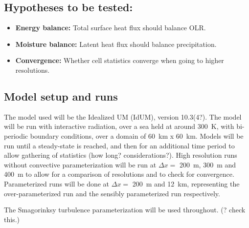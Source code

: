 \documentclass{article}
\begin{document}
\subsection*{Hypotheses to be tested:}

\begin{itemize}
    \item \textbf{Energy balance:} Total surface heat flux should balance OLR.
    \item \textbf{Moisture balance:} Latent heat flux should balance precipitation.
    \item \textbf{Convergence:} Whether cell statistics converge when going to higher resolutions.
\end{itemize}

\subsection*{Model setup and runs}

The model used will be the Idealized UM (IdUM), version 10.3(4?). The model will be run with
interactive radiation, over a sea held at around \SI{300}{K}, with bi-periodic boundary conditions,
over a domain of \SI{60}{km} x \SI{60}{km}. Models will be run until a steady-state is reached, and
then for an additional time period to allow gathering of statistics (how long? considerations?).
High resolution runs without convective parameterization will be run at $\Delta x = $ \SI{200}{m},
\SI{300}{m} and \SI{400}{m} to allow for a comparison of resolutions and to check for convergence.
Parameterized runs will be done at $\Delta x = $ \SI{200}{m} and \SI{12}{km}, representing the
over-parameterized run and the sensibly parameterized run respectively. 

The Smagorinksy turbulence parameterization will be used throughout. (? check this.)
\end{document}
